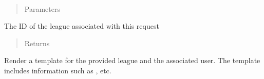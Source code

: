 \documentclass[letterpaper,10pt,english]{sphinxmanual}
\begin{document}
\begin{fulllineitems}
\label{\detokenize{tiger_leagues/readme:tiger_leagues.league.league_homepage}}~\begin{quote}\begin{description}
\item[{Parameters}] \leavevmode
{} \textendash{} 

\end{description}\end{quote}

The ID of the league associated with this request
\begin{quote}\begin{description}
\item[{Returns}] \leavevmode
{}

\end{description}\end{quote}

Render a template for the provided league and the associated user. The 
template includes information such as , etc.

\end{fulllineitems}

\end{document}
